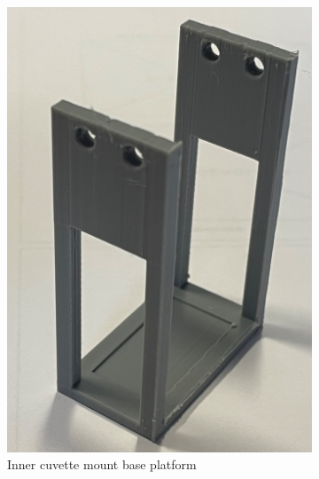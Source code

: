 \begin{figure}[H]
    \centering
    \begin{subfigure}[a]{0.25\textwidth}
    \centering
    \includegraphics[width=1\linewidth]{Images/Lower_Mount.png}
    \caption{Inner cuvette mount base platform}
    \end{subfigure}
    ~ 
    \begin{subfigure}[a]{0.25\textwidth}
    \centering

\end{subfigure}
\end{figure}
